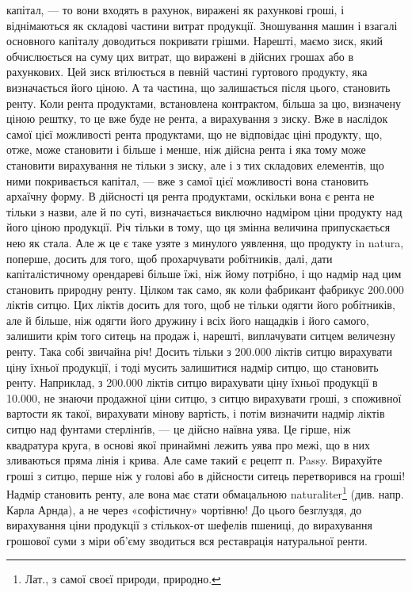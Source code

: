 \parcont{}  %
капітал, — то вони входять в рахунок, виражені як рахункові гроші, і віднімаються
як складові частини витрат продукції. Зношування машин і взагалі
основного капіталу доводиться покривати грішми. Нарешті, маємо зиск, який
обчислюється на суму цих витрат, що виражені в дійсних грошах або в рахункових.
Цей зиск втілюється в певній частині гуртового продукту, яка визначається
його ціною. А та частина, що залишається після цього, становить ренту.
Коли рента продуктами, встановлена контрактом, більша за цю, визначену ціною
рештку, то це вже буде не рента, а вирахування з зиску. Вже в наслідок самої
цієї можливості рента продуктами, що не відповідає ціні продукту, що, отже,
може становити і більше і менше, ніж дійсна рента і яка тому може становити
вирахування не тільки з зиску, але і з тих складових елементів, що ними покривається
капітал, — вже з самої цієї можливості вона становить архаїчну
форму. В дійсності ця рента продуктами, оскільки вона є рента не тільки з
назви, але й по суті, визначається виключно надміром ціни продукту над його
ціною продукції. Річ тільки в тому, що ця змінна величина припускається нею
як стала. Але ж це є таке узяте з минулого уявлення, що продукту in natura,
поперше, досить для того, щоб прохарчувати робітників, далі, дати капіталістичному
орендареві більше їжі, ніж йому потрібно, і що надмір над цим становить
природну ренту. Цілком так само, як коли фабрикант фабрикує \num{200.000}
ліктів ситцю. Цих ліктів досить для того, щоб не тільки одягти його робітників,
але й більше, ніж одягти його дружину і всіх його нащадків і його самого, залишити
крім того ситець на продаж і, нарешті, виплачувати ситцем величезну
ренту. Така собі звичайна річ! Досить тільки з \num{200.000} ліктів ситцю вирахувати
ціну їхньої продукції, і тоді мусить залишитися надмір ситцю, що становить
ренту. Наприклад, з \num{200.000} ліктів ситцю вирахувати ціну їхньої продукції
в \num{10.000}, не знаючи продажної ціни ситцю, з ситцю вирахувати
гроші, з споживної вартости як такої, вирахувати мінову вартість, і потім визначити
надмір ліктів ситцю над фунтами стерлінґів, — це дійсно наївна уява.
Це гірше, ніж квадратура круга, в основі якої принаймні лежить уява про
межі, що в них зливаються пряма лінія і крива. Але саме такий є рецепт п.
Passy. Вирахуйте гроші з ситцю, перше ніж у голові або в дійсности ситець
перетворився на гроші! Надмір становить ренту, але вона має стати обмацальною
naturaliter\footnote*{
Лат., з самої своєї природи, природно. 
} (див. напр. Карла Арнда), а не через «софістичну» чортівню!
До цього безглуздя, до вирахування ціни продукції з стількох-от шефелів пшениці,
до вирахування грошової суми з міри об’єму зводиться вся реставрація
натуральної ренти.


